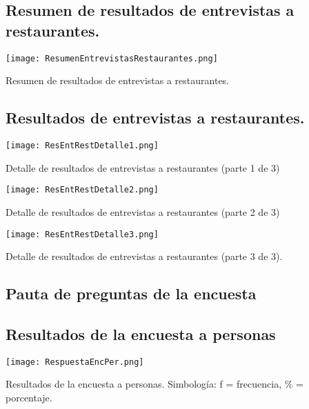 \newpage
\subsection{Resumen de resultados de entrevistas a restaurantes.}
\label{ResResEntRest}

\begin{table}[H]
\label{ResumenEntrevistasRestaurantes}
\centering
\texttt{[image: ResumenEntrevistasRestaurantes.png]}
\caption{Resumen de resultados de entrevistas a restaurantes.}
\end{table}

\newpage
\subsection{Resultados de entrevistas a restaurantes.} \label{ResEntRest}
\begin{table}[H]
\centering
\texttt{[image: ResEntRestDetalle1.png]}
\caption{Detalle de resultados de entrevistas a restaurantes (parte 1 de 3)}
\label{ResEntRestDetalle1}
\end{table}

\begin{table}[H]
\centering
\texttt{[image: ResEntRestDetalle2.png]}
\caption{Detalle de resultados de entrevistas a restaurantes (parte 2 de 3)}
\label{ResEntRestDetalle2}
\end{table}

\begin{table}[H]
\centering
\texttt{[image: ResEntRestDetalle3.png]}
\caption{Detalle de resultados de entrevistas a restaurantes (parte 3 de 3).}
\label{ResEntRestDetalle3}
\end{table}

\subsection{Pauta de preguntas de la encuesta} \label{PauEnc}


\subsection{Resultados de la encuesta a personas} \label{ResEncPer}

\begin{table}[H]
\centering
\texttt{[image: RespuestaEncPer.png]}
\caption{Resultados de la encuesta a personas. Simbología: f = frecuencia, \% = porcentaje.}
\label{RespuestaEncPer}
\end{table}


